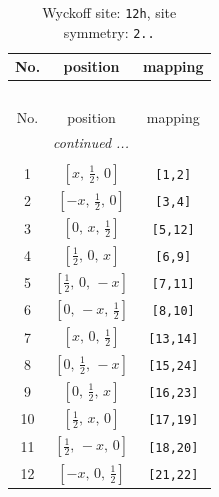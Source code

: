\documentclass[fleqn,8pt]{jsarticle}
\begin{document}
\begin{longtable}{ccc}
\caption{Wyckoff site: {\tt 12h}, site symmetry: {\tt 2..}}
 \\
 \hline \hline
No. & position & mapping \\ \hline \endfirsthead

\multicolumn{2}{l}{\tablename\ \thetable{}} \\
 \hline \hline
No. & position & mapping \\ \hline \endhead

 \hline \hline
\multicolumn{2}{r}{\footnotesize\it continued ...} \\ \endfoot

 \hline \hline
\multicolumn{2}{r}{} \\ \endlastfoot

1 & $\left[ x,\, \frac{1}{2},\, 0 \right]$ & {\tt [1,2]} \\ \hline
2 & $\left[ - x,\, \frac{1}{2},\, 0 \right]$ & {\tt [3,4]} \\ \hline
3 & $\left[ 0,\, x,\, \frac{1}{2} \right]$ & {\tt [5,12]} \\ \hline
4 & $\left[ \frac{1}{2},\, 0,\, x \right]$ & {\tt [6,9]} \\ \hline
5 & $\left[ \frac{1}{2},\, 0,\, - x \right]$ & {\tt [7,11]} \\ \hline
6 & $\left[ 0,\, - x,\, \frac{1}{2} \right]$ & {\tt [8,10]} \\ \hline
7 & $\left[ x,\, 0,\, \frac{1}{2} \right]$ & {\tt [13,14]} \\ \hline
8 & $\left[ 0,\, \frac{1}{2},\, - x \right]$ & {\tt [15,24]} \\ \hline
9 & $\left[ 0,\, \frac{1}{2},\, x \right]$ & {\tt [16,23]} \\ \hline
10 & $\left[ \frac{1}{2},\, x,\, 0 \right]$ & {\tt [17,19]} \\ \hline
11 & $\left[ \frac{1}{2},\, - x,\, 0 \right]$ & {\tt [18,20]} \\ \hline
12 & $\left[ - x,\, 0,\, \frac{1}{2} \right]$ & {\tt [21,22]} \\
\end{longtable}
\renewcommand{\arraystretch}{1.2}
\end{document}

